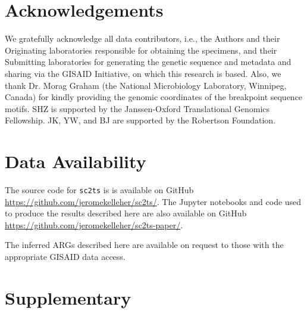\documentclass{article}
\begin{document}
\section{Acknowledgements}
We gratefully acknowledge all data contributors, i.e., the Authors and their
Originating laboratories responsible for obtaining the specimens, and their
Submitting laboratories for generating the genetic sequence and metadata and
sharing via the GISAID Initiative, on which this research is based. Also, we
thank Dr. Morag Graham (the National Microbiology Laboratory, Winnipeg, Canada)
for kindly providing the genomic coordinates of the breakpoint sequence motifs.
SHZ is supported by the Janssen-Oxford Translational Genomics Fellowship. JK,
YW, and BJ are supported by the Robertson Foundation.

\section{Data Availability}
The source code for \texttt{sc2ts} is
is available on GitHub
\url{https://github.com/jeromekelleher/sc2ts/}.
The Jupyter notebooks and code used to produce the results described here are also
available on GitHub \url{https://github.com/jeromekelleher/sc2ts-paper/}.

The inferred ARGs described here are available on request to those with
the appropriate GISAID data access.




\renewcommand\thefigure{S\arabic{figure}}
\setcounter{figure}{0}
\renewcommand\thetable{S\arabic{table}}
\setcounter{table}{0}
\section*{Supplementary}
\end{document}
